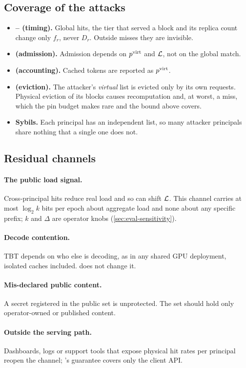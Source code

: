 \subsection{Coverage of the attacks}
\begin{itemize}
\item \textbf{-- (timing).} Global hits, the tier that served a block and
  its replica count change only $f_r$, never $D_r$. Outside misses they are
  invisible.
\item \textbf{ (admission).} Admission depends on $p^{\mathrm{virt}}$ and $\mathcal{L}$, not on the
  global match.
\item \textbf{ (accounting).} Cached tokens are reported as $p^{\mathrm{virt}}$.
\item \textbf{ (eviction).} The attacker's \emph{virtual} list is evicted only
  by its own requests. Physical eviction of its blocks causes recomputation and,
  at worst, a miss, which the pin budget makes rare and the bound above covers.
\item \textbf{Sybils.} Each principal has an independent list, so many attacker
  principals share nothing that a single one does not.
\end{itemize}

\subsection{Residual channels}
\paragraph{The public load signal.} Cross-principal hits reduce real load and so
can shift $\mathcal{L}$. This channel carries at most $\log_2 k$ bits per epoch about
aggregate load and none about any specific prefix; $k$ and $\Delta$ are
operator knobs (\cref{sec:eval-sensitivity}).

\paragraph{Decode contention.} TBT depends on who else is decoding, as in any
shared GPU deployment, isolated caches included. \sys does not change it.

\paragraph{Mis-declared public content.} A secret registered in the public set
is unprotected. The set should hold only operator-owned or published content.

\paragraph{Outside the serving path.} Dashboards, logs or support tools that
expose physical hit rates per principal reopen the channel; \sys's guarantee
covers only the client API.
